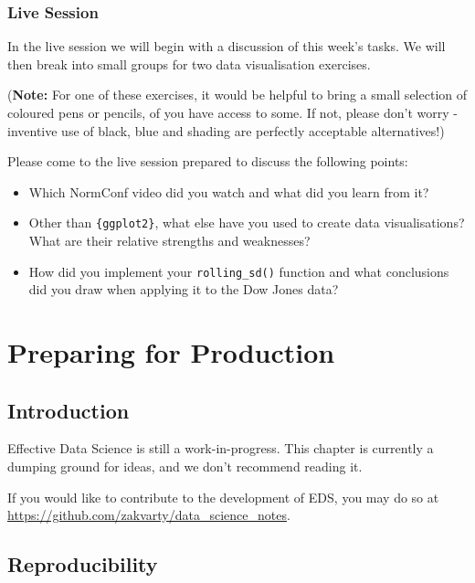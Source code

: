 \documentclass[
  12pt,
]{book}
\begin{document}
\hypertarget{live-session-2}{%
\section{Live Session}\label{live-session-2}}

In the live session we will begin with a discussion of this week's tasks. We will then break into small groups for two data visualisation exercises.

(\textbf{Note:} For one of these exercises, it would be helpful to bring a small selection of coloured pens or pencils, of you have access to some. If not, please don't worry - inventive use of black, blue and shading are perfectly acceptable alternatives!)

Please come to the live session prepared to discuss the following points:

\begin{itemize}
\item
  Which NormConf video did you watch and what did you learn from it?
\item
  Other than \texttt{\{ggplot2\}}, what else have you used to create data visualisations? What are their relative strengths and weaknesses?
\item
  How did you implement your \texttt{rolling\_sd()} function and what conclusions did you draw when applying it to the Dow Jones data?
\end{itemize}

\hypertarget{part-preparing-for-production}{%
\part{Preparing for Production}\label{part-preparing-for-production}}

\hypertarget{production-introduction}{%
\chapter*{Introduction}\label{production-introduction}}

Effective Data Science is still a work-in-progress. This chapter is currently a dumping ground for ideas, and we don't recommend reading it.

If you would like to contribute to the development of EDS, you may do so at \url{https://github.com/zakvarty/data_science_notes}.

\hypertarget{production-reproducibility}{%
\chapter{Reproducibility}\label{production-reproducibility}}
\end{document}
